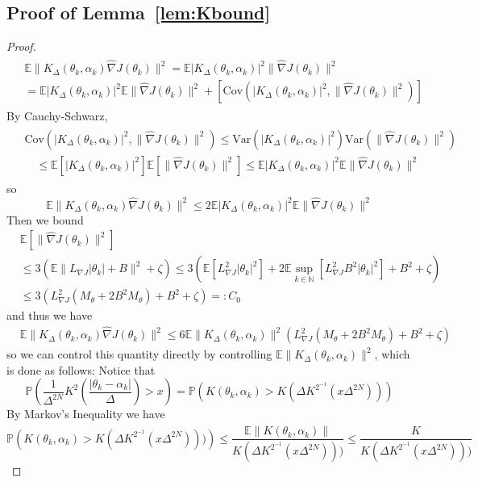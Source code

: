 \documentclass[journal,onecolumn]{IEEEtran}
\newcommand{\alk}{\alpha_k}
\newcommand{\thk}{\theta_k}
\newcommand{\grad}{\nabla}
\newcommand{\gradn}{\hat{\nabla}}
\newcommand{\rew}{J}
\newcommand{\CE}{\mathbb{E}}
\newcommand{\PR}{\mathbb{P}}
\newcommand{\dimn}{N}
\newcommand{\K}{K}
\newcommand{\Kd}{\K_{\Delta}}
\newcommand{\N}{\mathbb{N}}
\newcommand{\etsup}{M_{\theta}}
\newcommand{\gradnvar}{\zeta}
\newcommand{\ksup}{\hat{K}}
\newcommand{\lipGJ}{L_{\grad\rew}}
\begin{document}
{\subsection*{Proof of Lemma~\ref{lem:Kbound}}
\begin{proof}
\begin{align*}
\begin{split}
&\CE \|\Kd(\thk,\alk)\gradn \rew(\thk)\|^2 = \CE |\Kd(\thk,\alk)|^2 \|\gradn \rew(\thk)\|^2  \\ & = \CE |\Kd(\thk,\alk)|^2\CE \|\gradn \rew(\thk)\|^2 + \left[\textrm{Cov}\left(|\Kd(\thk,\alk)|^2, \|\gradn \rew(\thk)\|^2\right)\right]
\end{split}
\end{align*}
By Cauchy-Schwarz,
\begin{align*}
    \begin{split}
        &\textrm{Cov}\left(|\Kd(\thk,\alk)|^2, \|\gradn \rew(\thk)\|^2\right)\leq \textrm{Var}\left(|\Kd(\thk,\alk)|^2\right)\textrm{Var}\left(\|\gradn \rew(\thk)\|^2\right) \\
        & \quad \leq \CE \left[|\Kd(\thk,\alk)|^2\right] \CE \left[\|\gradn \rew(\thk)\|^2\right] \leq \CE |\Kd(\thk,\alk)|^2 \CE \|\gradn \rew(\thk)\|^2
    \end{split}
\end{align*}
so
\[\CE \|\Kd(\thk,\alk)\gradn \rew(\thk)\|^2 \leq 2\CE |\Kd(\thk,\alk)|^2 \CE \|\gradn \rew(\thk)\|^2\]
Then we bound
\begin{align*}
    &\CE \left[\|\gradn \rew(\thk)\|^2\right] \\&\leq 3(\CE\|\lipGJ|\thk| + B\|^2 + \gradnvar) \leq 3(\CE \left[\lipGJ^2|\thk|^2\right] + 2\CE\sup_{k\in\N}\left[\lipGJ^2B^2|\thk|^2 \right] + B^2 + \gradnvar) \\
    & \leq 3(\lipGJ^2 (\etsup + 2B^2 \etsup) + B^2 + \gradnvar) =: C_0
\end{align*}
and thus we have 
\begin{align}
\label{eq:esq_bd}
    &\CE \|\Kd(\thk,\alk)\gradn \rew(\thk)\|^2 \leq 6\CE\|\Kd(\thk,\alk)\|^2\left(\lipGJ^2 (\etsup + 2B^2 \etsup) + B^2 + \gradnvar\right)
\end{align}
so we can control this quantity directly by controlling $\CE\|K_{\Delta}(\thk,\alk)\|^2$, which is done as follows:
Notice that
\[\PR\left(\frac{1}{\Delta^{2\dimn}} K^2\left(\frac{|\thk-\alk|}{\Delta}\right) > x \right) = \PR \left(K(\thk,\alk) > K(\Delta K^{2^{-1}}(x\Delta^{2\dimn})) \right)\]
By Markov's Inequality we have 
\[\PR \left(K(\thk,\alk) > K(\Delta K^{2^{-1}}(x\Delta^{2\dimn}))) \right) \leq \frac{\CE\|K(\thk,\alk)\|}{K(\Delta K^{2^{-1}}(x\Delta^{2\dimn})))} \leq \frac{\ksup}{K(\Delta K^{2^{-1}}(x\Delta^{2\dimn})))}\]

\end{proof}}
\end{document}
